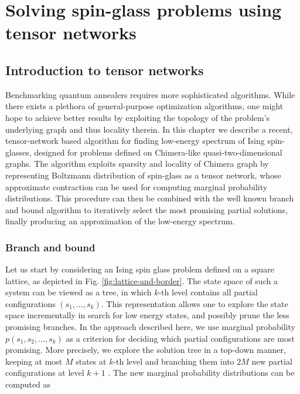 \chapter{Solving spin-glass problems using tensor networks}
\label{chapter:tn}

\section{Introduction to tensor networks}

Benchmarking quantum annealers requires more sophisticated algorithms. 
While there exists a plethora of general-purpose optimization algorithms, one might hope to achieve better results by exploiting the topology of the problem's underlying graph and thus locality therein. In this chapter we describe a recent, tensor-network based algorithm for finding low-energy spectrum of Ising spin-glasses, designed for problems defined on Chimera-like quasi-two-dimensional graphs. The algorithm exploits sparsity and locality of Chimera graph by representing Boltzmann distribution of spin-glass as a tensor network, whose approximate contraction can be used for computing marginal probability distributions. This procedure can then be combined with the well known branch and bound algorithm to iteratively select the most promising partial solutions, finally producing an approximation of the low-energy spectrum.


\subsection{Branch and bound}
Let us start by considering an Ising spin glass problem defined on a square lattice, as depicted in Fig. \ref{fig:lattice-and-border}.  The state space of such a system can be viewed as a tree, in which $k$-th level contains all partial configurations $(s_1, \ldots, s_k)$. This representation allows one to explore the state space incrementally in search for low energy states, and possibly prune the less promising branches. In the approach described here, we use marginal probability $p(s_1, s_2, \ldots, s_k)$ as a criterion for deciding which partial configurations are most promising. More precisely, we explore the solution tree in a top-down manner, keeping at most $M$ states at $k$-th level and branching them into $2M$ new partial configurations at level $k+1$ . The new marginal probability distributions can be computed as

